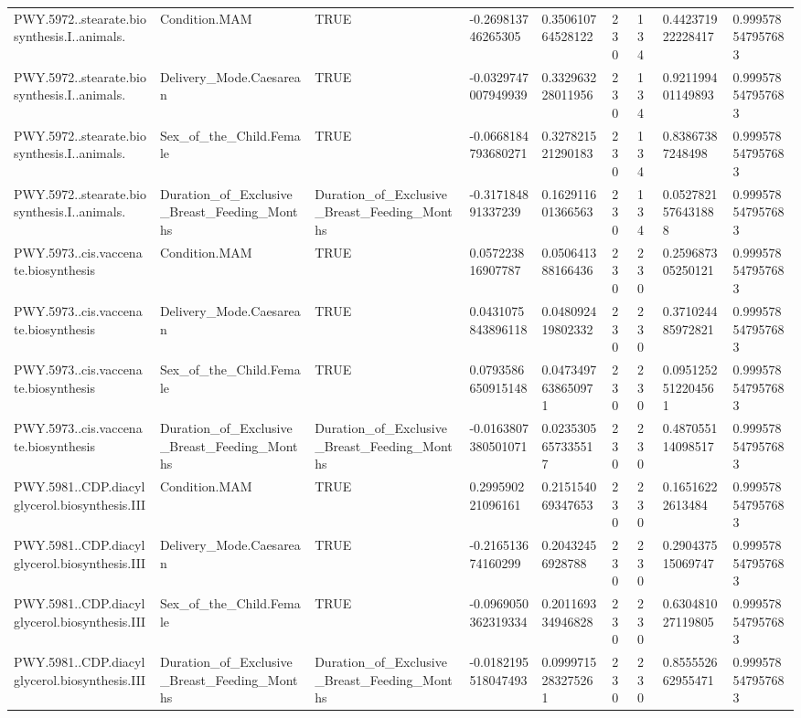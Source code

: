 \begin{longtable}{lllllllll}
PWY.5972..stearate.biosynthesis.I..animals. & Condition.MAM & TRUE & -0.269813746265305 & 0.350610764528122 & 230 & 134 & 0.442371922228417 & 0.999578547957683 \\
PWY.5972..stearate.biosynthesis.I..animals. & Delivery\_Mode.Caesarean & TRUE & -0.0329747007949939 & 0.332963228011956 & 230 & 134 & 0.921199401149893 & 0.999578547957683 \\
PWY.5972..stearate.biosynthesis.I..animals. & Sex\_of\_the\_Child.Female & TRUE & -0.0668184793680271 & 0.327821521290183 & 230 & 134 & 0.83867387248498 & 0.999578547957683 \\
PWY.5972..stearate.biosynthesis.I..animals. & Duration\_of\_Exclusive\_Breast\_Feeding\_Months & Duration\_of\_Exclusive\_Breast\_Feeding\_Months & -0.317184891337239 & 0.162911601366563 & 230 & 134 & 0.0527821576431888 & 0.999578547957683 \\
PWY.5973..cis.vaccenate.biosynthesis & Condition.MAM & TRUE & 0.057223816907787 & 0.050641388166436 & 230 & 230 & 0.259687305250121 & 0.999578547957683 \\
PWY.5973..cis.vaccenate.biosynthesis & Delivery\_Mode.Caesarean & TRUE & 0.0431075843896118 & 0.048092419802332 & 230 & 230 & 0.371024485972821 & 0.999578547957683 \\
PWY.5973..cis.vaccenate.biosynthesis & Sex\_of\_the\_Child.Female & TRUE & 0.0793586650915148 & 0.0473497638650971 & 230 & 230 & 0.0951252512204561 & 0.999578547957683 \\
PWY.5973..cis.vaccenate.biosynthesis & Duration\_of\_Exclusive\_Breast\_Feeding\_Months & Duration\_of\_Exclusive\_Breast\_Feeding\_Months & -0.0163807380501071 & 0.0235305657335517 & 230 & 230 & 0.487055114098517 & 0.999578547957683 \\
PWY.5981..CDP.diacylglycerol.biosynthesis.III & Condition.MAM & TRUE & 0.299590221096161 & 0.215154069347653 & 230 & 230 & 0.16516222613484 & 0.999578547957683 \\
PWY.5981..CDP.diacylglycerol.biosynthesis.III & Delivery\_Mode.Caesarean & TRUE & -0.216513674160299 & 0.20432456928788 & 230 & 230 & 0.290437515069747 & 0.999578547957683 \\
PWY.5981..CDP.diacylglycerol.biosynthesis.III & Sex\_of\_the\_Child.Female & TRUE & -0.0969050362319334 & 0.201169334946828 & 230 & 230 & 0.630481027119805 & 0.999578547957683 \\
PWY.5981..CDP.diacylglycerol.biosynthesis.III & Duration\_of\_Exclusive\_Breast\_Feeding\_Months & Duration\_of\_Exclusive\_Breast\_Feeding\_Months & -0.0182195518047493 & 0.0999715283275261 & 230 & 230 & 0.855552662955471 & 0.999578547957683 \\

\end{longtable}
